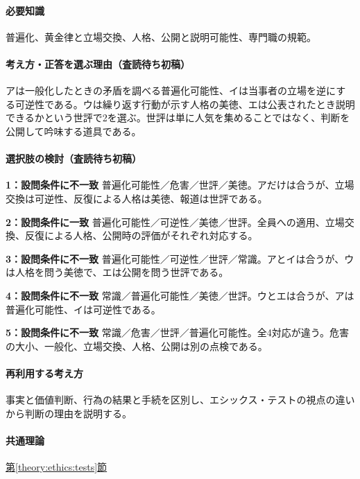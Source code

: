 \paragraph{必要知識} 普遍化、黄金律と立場交換、人格、公開と説明可能性、専門職の規範。

\paragraph{考え方・正答を選ぶ理由（査読待ち初稿）} アは一般化したときの矛盾を調べる普遍化可能性、イは当事者の立場を逆にする可逆性である。ウは繰り返す行動が示す人格の美徳、エは公表されたとき説明できるかという世評で2を選ぶ。世評は単に人気を集めることではなく、判断を公開して吟味する道具である。

\paragraph{選択肢の検討（査読待ち初稿）}\mbox{}\par

\noindent\textbf{1：設問条件に不一致} 普遍化可能性／危害／世評／美徳。アだけは合うが、立場交換は可逆性、反復による人格は美徳、報道は世評である。\par

\noindent\textbf{2：設問条件に一致} 普遍化可能性／可逆性／美徳／世評。全員への適用、立場交換、反復による人格、公開時の評価がそれぞれ対応する。\par

\noindent\textbf{3：設問条件に不一致} 普遍化可能性／可逆性／世評／常識。アとイは合うが、ウは人格を問う美徳で、エは公開を問う世評である。\par

\noindent\textbf{4：設問条件に不一致} 常識／普遍化可能性／美徳／世評。ウとエは合うが、アは普遍化可能性、イは可逆性である。\par

\noindent\textbf{5：設問条件に不一致} 常識／危害／世評／普遍化可能性。全4対応が違う。危害の大小、一般化、立場交換、人格、公開は別の点検である。\par

\paragraph{再利用する考え方} 事実と価値判断、行為の結果と手続を区別し、エシックス・テストの視点の違いから判断の理由を説明する。

\paragraph{共通理論} \hyperref[theory:ethics:tests]{第\ref*{theory:ethics:tests}節}

